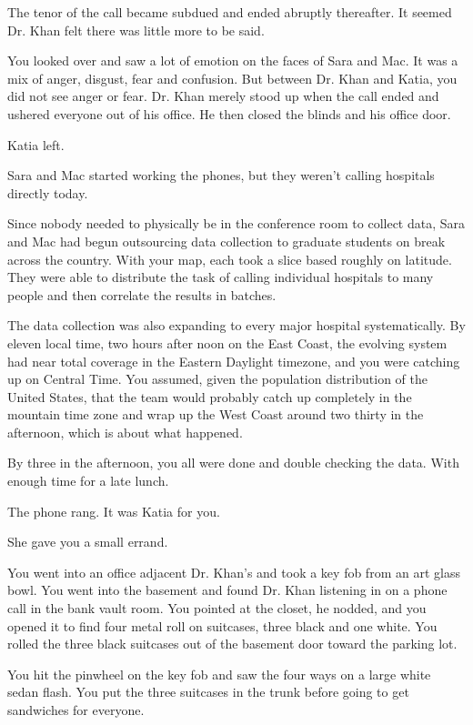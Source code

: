 \documentclass[17pt, twoside, a5paper, openright, extrafontsizes]{memoir}
\begin{document}
The tenor of the call became subdued and ended abruptly thereafter. It
seemed Dr. Khan felt there was little more to be said.

You looked over and saw a lot of emotion on the faces of Sara and Mac.
It was a mix of anger, disgust, fear and confusion. But between Dr. Khan
and Katia, you did not see anger or fear. Dr. Khan merely stood up when
the call ended and ushered everyone out of his office. He then closed
the blinds and his office door.

Katia left.

Sara and Mac started working the phones, but they weren't calling
hospitals directly today.

Since nobody needed to physically be in the conference room to collect
data, Sara and Mac had begun outsourcing data collection to graduate
students on break across the country. With your map, each took a slice
based roughly on latitude. They were able to distribute the task of
calling individual hospitals to many people and then correlate the
results in batches.

The data collection was also expanding to every major hospital
systematically. By eleven local time, two hours after noon on the East
Coast, the evolving system had near total coverage in the Eastern
Daylight timezone, and you were catching up on Central Time. You
assumed, given the population distribution of the United States, that
the team would probably catch up completely in the mountain time zone
and wrap up the West Coast around two thirty in the afternoon, which is
about what happened.

By three in the afternoon, you all were done and double checking the
data. With enough time for a late lunch.

The phone rang. It was Katia for you.

She gave you a small errand.

You went into an office adjacent Dr. Khan's and took a key fob from an
art glass bowl. You went into the basement and found Dr. Khan listening
in on a phone call in the bank vault room. You pointed at the closet, he
nodded, and you opened it to find four metal roll on suitcases, three
black and one white. You rolled the three black suitcases out of the
basement door toward the parking lot.

You hit the pinwheel on the key fob and saw the four ways on a large
white sedan flash. You put the three suitcases in the trunk before going
to get sandwiches for everyone.
\end{document}
